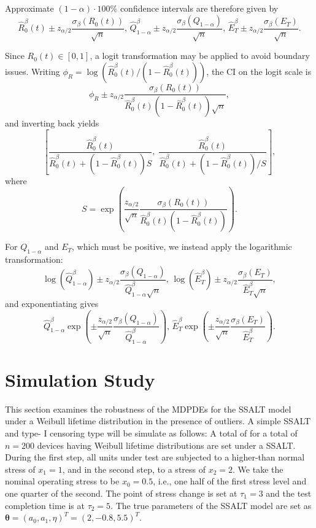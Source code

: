 \documentclass{article}
\begin{document}
Approximate $(1-\alpha)\cdot100\%$ confidence intervals are therefore given by
\begin{equation}
\widehat{R}_0^\beta(t) \pm z_{\alpha/2}\frac{\sigma_{\beta}(R_0(t))}{\sqrt{n}}, \,
\widehat{Q}^\beta_{1-\alpha} \pm z_{\alpha/2}\frac{\sigma_{\beta}(Q_{1-\alpha})}{\sqrt{n}}, \,
\widehat{E}_T^{\beta} \pm z_{\alpha/2}\frac{\sigma_{\beta}(E_T)}{\sqrt{n}}.
\end{equation}

Since $R_0(t)\in[0,1]$, a logit transformation may be applied to avoid boundary issues. Writing 
$\phi_R = \log\left(\widehat{R}_0^\beta(t)/(1-\widehat{R}_0^\beta(t))\right)$, the CI on the logit scale is
\[
\phi_R \pm z_{\alpha/2}\frac{\sigma_{\beta}(R_0(t))}{\widehat{R}_0^\beta(t)(1-\widehat{R}_0^\beta(t))\sqrt{n}},
\]
and inverting back yields
\begin{equation}
\left[
\frac{\widehat{R}_0^\beta(t)}{\widehat{R}_0^\beta(t)+(1-\widehat{R}_0^\beta(t))S},
\;
\frac{\widehat{R}_0^\beta(t)}{\widehat{R}_0^\beta(t)+(1-\widehat{R}_0^\beta(t))/S}
\right],
\end{equation}
where
\[
S=\exp\left(\frac{z_{\alpha/2}}{\sqrt{n}}\frac{\sigma_{\beta}(R_0(t))}{\widehat{R}_0^\beta(t)(1-\widehat{R}_0^\beta(t))}\right).
\]

For $Q_{1-\alpha}$ and $E_T$, which must be positive, we instead apply the logarithmic transformation:
\[
\log(\widehat{Q}_{1-\alpha}^\beta)\pm z_{\alpha/2}\frac{\sigma_{\beta}(Q_{1-\alpha})}{\widehat{Q}_{1-\alpha}^\beta\sqrt{n}}, \,
\log(\widehat{E}_T^\beta)\pm z_{\alpha/2}\frac{\sigma_{\beta}(E_T)}{\widehat{E}_T^\beta\sqrt{n}},
\]
and exponentiating gives
\begin{equation}
\widehat{Q}_{1-\alpha}^\beta\exp\!\left(\pm\frac{z_{\alpha/2}}{\sqrt{n}}
\frac{\sigma_{\beta}(Q_{1-\alpha})}{\widehat{Q}_{1-\alpha}^\beta}\right),\,
\widehat{E}_T^\beta\exp\!\left(\pm\frac{z_{\alpha/2}}{\sqrt{n}}
\frac{\sigma_{\beta}(E_T)}{\widehat{E}_T^\beta}\right).
\end{equation}



\section{Simulation Study}
This section examines the robustness of the MDPDEs for the SSALT model under a Weibull lifetime distribution in the presence of outliers.
A simple SSALT and type- I censoring type will be simulate as follows:
A total of for a total of $n=200$ devices having Weibull lifetime distributions are set under a SSALT. During the first step, all units under test are subjected to a higher-than normal stress of $x_1=1$, and in the second step, to a stress of $x_2=2$. We take the nominal operating stress to be \(x_0=0.5\), i.e., one half of the first stress level and one quarter of the second.
The point of stress change is set at
$\tau_1=3$ and the test completion time is at $\tau_2=5.$ 
The true parameters of the SSALT model are set as $\boldsymbol{\theta} = (a_0, a_1, \eta)^T=(2, -0.8, 5.5)^T.$ 
\end{document}
